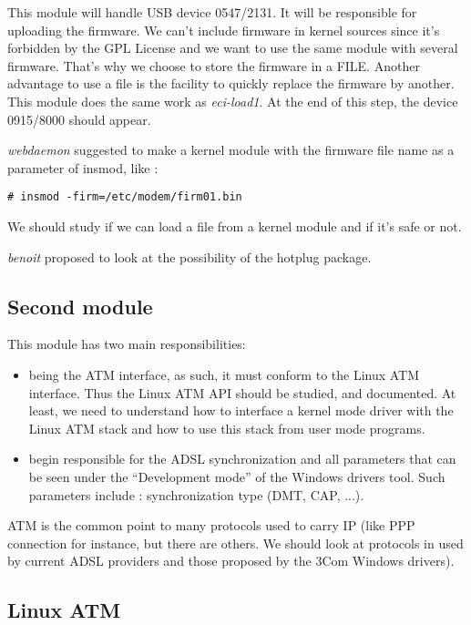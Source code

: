 \documentclass[a4paper,12pt]{article}
\begin{document}
This module will handle USB device 0547/2131. It will be responsible
for uploading the firmware. We can't include firmware in kernel
sources since it's forbidden by the GPL License and we want to use the
same module with several firmware.  That's why we choose to store the
firmware in a FILE. Another advantage to use a file is the facility to
quickly replace the firmware by another. This module does the same
work as \textit{eci-load1}. At the end of this step, the device
0915/8000 should appear.

\textit{webdaemon} suggested to make a kernel module with the firmware
file name as a parameter of insmod, like :
\begin{verbatim}
# insmod -firm=/etc/modem/firm01.bin
\end{verbatim}

We should study if we can load a file from a kernel module and if it's
safe or not.

\textit{benoit} proposed to look at the possibility of the hotplug
package.

\subsection{Second module}

This module has two main responsibilities:

\begin{itemize}
  
\item being the ATM interface, as such, it must conform to the Linux
  ATM interface. Thus the Linux ATM API should be studied, and
  documented. At least, we need to understand how to interface a
  kernel mode driver with the Linux ATM stack and how to use this
  stack from user mode programs.
  
\item begin responsible for the ADSL synchronization and all
  parameters that can be seen under the ``Development mode'' of the
  Windows drivers tool. Such parameters include : synchronization type
  (DMT, CAP, ...).

\end{itemize}

ATM is the common point to many protocols used to carry IP (like PPP
connection for instance, but there are others. We should look at
protocols in used by current ADSL providers and those proposed by the
3Com Windows drivers).

\subsection{Linux ATM}
\end{document}
